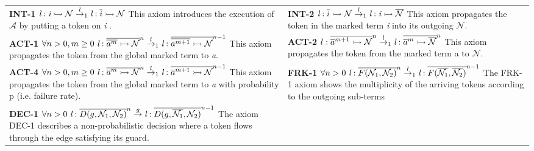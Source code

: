 \documentclass[3p,times,procedia,authoryear,round]{elsarticle}
\begin{document}
\begin{table}[ht]
	\begin{center}
		\scriptsize
		\begin{tabular}{ m{7cm} m{7cm} }
			
			
			\textbf{INT-1} $\emph{l} : \emph{i} \rightarrowtail \mathcal{N} \stackrel{l }{\rightarrow}_{1} \emph{l} : \overline{i} \rightarrowtail \mathcal{N} $
			This axiom introduces the execution of $\mathcal{A}$ by putting a
			token on \emph{i} .
			&
			\textbf{INT-2} $\emph{l} : \overline{i} \rightarrowtail \mathcal{N} \stackrel{l }{\rightarrow}_{1} \emph{l} : \emph{i}\rightarrowtail \mathcal{\overline{N}} $
			This axiom propagates the token in the marked term \emph{i} into its outgoing $\mathcal{N}$.
			\\
			\textbf{ACT-1} $ \forall n>0, m \geq 0 \ \emph{l} : \overline{\overline{a^{m}} \rightarrowtail \mathcal{N} }^{n} \stackrel{l }{\rightarrow}_{1} \emph{l} : \overline{\overline{a^{m+1}} \rightarrowtail \mathcal{N} }^{n-1}$
			This axiom propagates the token from the global marked term to \emph{a}.

&
			\textbf{ACT-2} $l:  \overline{\overline{a}^{m+1} \rightarrowtail \mathcal{N} }^{n}  \stackrel{l}{\rightarrow}_{1} \emph{l} : \overline{\overline{a}^{m} \rightarrowtail \overline{\mathcal{N}} }^{n}$
			This axiom propagates the token from the marked term a to $\mathcal{N}$.
\\

			\textbf{ACT-4} $ \forall n>0, m \geq 0 \ \emph{l} : \overline{\overline{a}^{m} \rightarrowtail \mathcal{N} }^{n} \stackrel{l }{\rightarrow}_{1} \emph{l} : \overline{\overline{a}^{m+1} \rightarrowtail \mathcal{N} }^{n-1}$
			This axiom propagates the token from the global marked term to \emph{a} with probability p (i.e. failure rate).
&
			\textbf{FRK-1} $  \forall n>0 \ \emph{l} : \overline{F(\mathcal{N}_{1}, \mathcal{N}_{2})}^{n} \stackrel{l }{\rightarrow}_{1} \emph{l} : \overline{F(\overline{\mathcal{N}_{1}}, \overline{\mathcal{N}_{2}})}^{n-1} $
			The FRK-1 axiom shows the multiplicity of the arriving tokens according to the outgoing sub-terms
			\\


			
			\textbf{DEC-1}  $   \forall n>0 \ \emph{l} : \overline{D(g,\mathcal{N}_{1}, \mathcal{N}_{2})}^{n} \stackrel{g}{\rightarrow} \emph{l} : \overline{D(g,\overline{\mathcal{N}_{1}}, \mathcal{N}_{2})}^{n-1} $
			The axiom DEC-1 describes a non-probabilistic decision where a token flows through the edge satisfying its guard.
			

\end{tabular}
\end{center}
\end{table}
\end{document}
